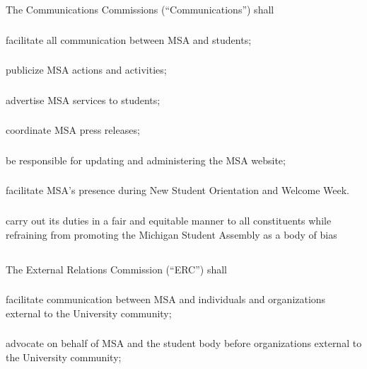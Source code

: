 \subsection{}
The Communications Commissions (``Communications'') shall
\subsubsection{}
facilitate all communication between MSA and students;
\subsubsection{}
publicize MSA actions and activities;
\subsubsection{}
advertise MSA services to students;
\subsubsection{}
coordinate MSA press releases;
\subsubsection{}
be responsible for updating and administering the MSA website;
\subsubsection{}
facilitate MSA's presence during New Student Orientation and Welcome Week.
\subsubsection{}
carry out its duties in a fair and equitable manner to all constituents while refraining from promoting the Michigan Student Assembly as a body of bias

\subsection{}
The External Relations Commission (``ERC'') shall
\subsubsection{}
facilitate communication between MSA and individuals and organizations external to the University community;
\subsubsection{}
advocate on behalf of MSA and the student body before organizations external to the University community;
